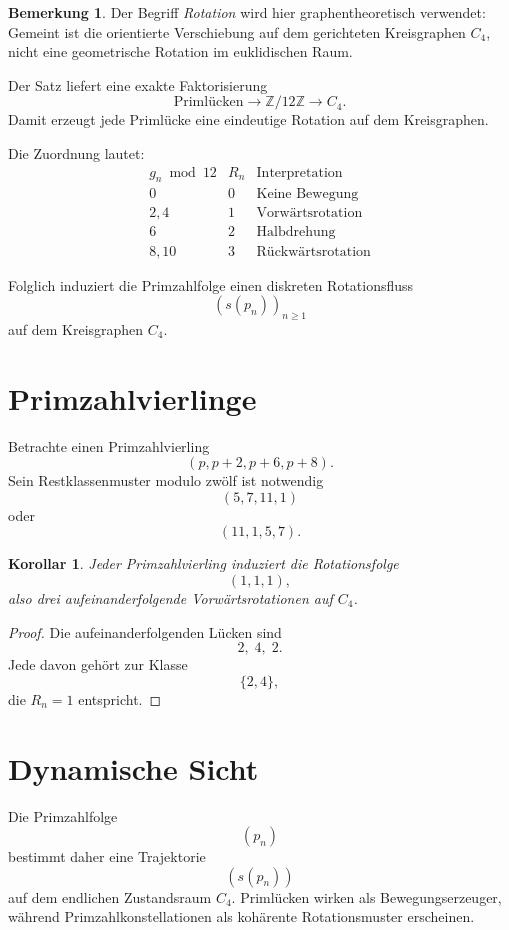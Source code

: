 \documentclass[11pt]{article}
\newtheorem{corollary}{Korollar}
\theoremstyle{definition}
\newtheorem{remark}{Bemerkung}
\begin{document}
\begin{remark}
Der Begriff \emph{Rotation} wird hier graphentheoretisch verwendet:
Gemeint ist die orientierte Verschiebung auf dem gerichteten Kreisgraphen $C_4$,
nicht eine geometrische Rotation im euklidischen Raum.
\end{remark}

Der Satz liefert eine exakte Faktorisierung
\[
\text{Priml\"ucken}
\longrightarrow
\mathbb{Z}/12\mathbb{Z}
\longrightarrow
C_4.
\]
Damit erzeugt jede Priml\"ucke eine eindeutige Rotation auf dem Kreisgraphen.

Die Zuordnung lautet:
\[
\begin{array}{c|c|c}
g_n\bmod 12 & R_n & \text{Interpretation}\\
\hline
0 & 0 & \text{Keine Bewegung}\\
2,4 & 1 & \text{Vorw\"artsrotation}\\
6 & 2 & \text{Halbdrehung}\\
8,10 & 3 & \text{R\"uckw\"artsrotation}
\end{array}
\]

Folglich induziert die Primzahlfolge einen diskreten Rotationsfluss
\[
(s(p_n))_{n\ge 1}
\]
auf dem Kreisgraphen $C_4$.

\section{Primzahlvierlinge}

Betrachte einen Primzahlvierling
\[
(p,p+2,p+6,p+8).
\]
Sein Restklassenmuster modulo zw\"olf ist notwendig
\[
(5,7,11,1)
\]
oder
\[
(11,1,5,7).
\]

\begin{corollary}
Jeder Primzahlvierling induziert die Rotationsfolge
\[
(1,1,1),
\]
also drei aufeinanderfolgende Vorw\"artsrotationen auf $C_4$.
\end{corollary}

\begin{proof}
Die aufeinanderfolgenden L\"ucken sind
\[
2,\;4,\;2.
\]
Jede davon geh\"ort zur Klasse
\[
\{2,4\},
\]
die $R_n=1$ entspricht.
\end{proof}

\section{Dynamische Sicht}

Die Primzahlfolge
\[
(p_n)
\]
bestimmt daher eine Trajektorie
\[
(s(p_n))
\]
auf dem endlichen Zustandsraum $C_4$.
Priml\"ucken wirken als Bewegungserzeuger, w\"ahrend Primzahlkonstellationen als koh\"arente Rotationsmuster erscheinen.
\end{document}
